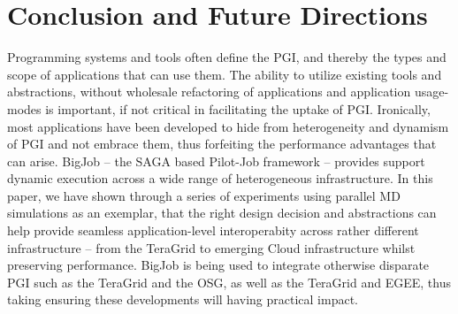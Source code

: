 \documentclass[conference,final]{IEEEtran}
\newcommand{\up}{\vspace*{-1em}}
\newcommand{\jhanote}[1]{ {\textcolor{red} { ***SJ: #1 }}}
\newcommand{\jhanote}[1]{}
\begin{document}

\up
\section{Conclusion and Future Directions}
\up Programming systems and tools often define the PGI, and thereby
the types and scope of applications that can use them. The ability to
utilize existing tools and abstractions, without wholesale refactoring
of applications and application usage-modes is important, if not
critical in facilitating the uptake of PGI. Ironically, most
applications have been developed to hide from heterogeneity and
dynamism of PGI and not embrace them, thus forfeiting the performance
advantages that can arise. BigJob -- the SAGA based Pilot-Job
framework -- provides support dynamic execution across a wide range of
heterogeneous infrastructure.%
In this paper, we have shown through a series of experiments using
parallel MD simulations as an exemplar, that the right design decision
and abstractions can help provide seamless application-level
interoperabity across rather different infrastructure -- from the
TeraGrid to emerging Cloud infrastructure whilst preserving
performance.  BigJob is being used to integrate otherwise disparate
PGI such as the TeraGrid and the OSG, as well as the TeraGrid and
EGEE, thus taking ensuring these developments will having practical
impact.
\end{document}
